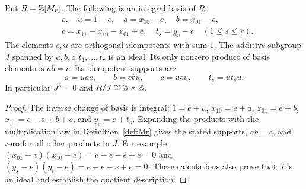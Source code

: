 \begin{lemma}\label{lem:Mr-ring}
Put $R=\mathbb Z[M_r]$.  The following is an integral basis of $R$:
\[
 \begin{aligned}
 &e,\quad u=1-e,\quad a=x_{10}-e,\quad b=x_{01}-e,\\
 &c=x_{11}-x_{10}-x_{01}+e,\quad t_s=y_s-e\quad(1\leq s\leq r).
 \end{aligned}
\]
The elements $e,u$ are orthogonal idempotents with sum $1$.  The additive
subgroup $J$ spanned by $a,b,c,t_1,\ldots,t_r$ is an ideal.  Its only
nonzero product of basis elements is $ab=c$.  Its idempotent supports are
\[
 a=uae,\qquad b=ebu,\qquad c=ucu,\qquad t_s=ut_su.
\]
In particular $J^3=0$ and $R/J\cong\mathbb Z\times\mathbb Z$.
\end{lemma}
\begin{proof}
The inverse change of basis is integral:
$1=e+u$, $x_{10}=e+a$, $x_{01}=e+b$, $x_{11}=e+a+b+c$,
and $y_s=e+t_s$.  Expanding the products with the multiplication law in
Definition~\ref{def:Mr} gives the stated supports, $ab=c$, and zero for
all other products in $J$.  For example,
$(x_{01}-e)(x_{10}-e)=e-e-e+e=0$ and
$(y_s-e)(y_t-e)=e-e-e+e=0$.  These calculations also prove that $J$ is an
ideal and establish the quotient description.
\end{proof}

